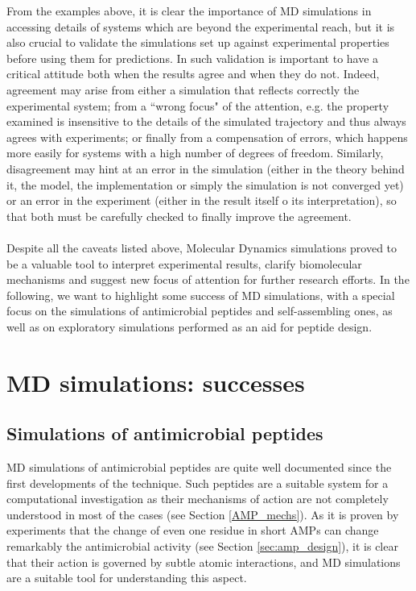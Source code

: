 From the examples above, it is clear the importance of MD simulations in accessing details of systems which are beyond the experimental reach, but it is also crucial to validate the simulations set up against experimental properties before using them for predictions.
%
In such validation is important to have a critical attitude both when the results agree and when they do not.
%
Indeed, agreement may arise from either a simulation that reflects correctly the experimental system; from a ``wrong focus" of the attention, e.g. the property examined is insensitive to the details of the simulated trajectory and thus always agrees with experiments; or finally from a compensation of errors, which happens more easily for systems with a high number of degrees of freedom.
%
Similarly, disagreement may hint at an error in the simulation (either in the theory behind it, the model, the implementation or simply the simulation is not converged yet) or an error in the experiment (either in the result itself o its interpretation), so that both must be carefully checked to finally improve the agreement.

\paragraph{}
Despite all the caveats listed above, Molecular Dynamics simulations proved to be a valuable tool to interpret experimental results, clarify biomolecular mechanisms and suggest new focus of attention for further research efforts.
%
In the following, we want to highlight some success of MD simulations, with a special focus on the simulations of antimicrobial peptides and self-assembling ones, as well as on exploratory simulations performed as an aid for peptide design.


\section{MD simulations: successes} \label{sec:md_lit}

\subsection{Simulations of antimicrobial peptides}
MD simulations of antimicrobial peptides are quite well documented since the first developments of the technique. Such peptides are a suitable system for a computational investigation as their mechanisms of action are not completely understood in most of the cases (see Section \ref{AMP_mechs}). As it is proven by experiments that the change of even one residue in short AMPs can change remarkably the antimicrobial activity (see Section \ref{sec:amp_design}), it is clear that their action is governed by subtle atomic interactions, and MD simulations are a suitable tool for understanding this aspect.

